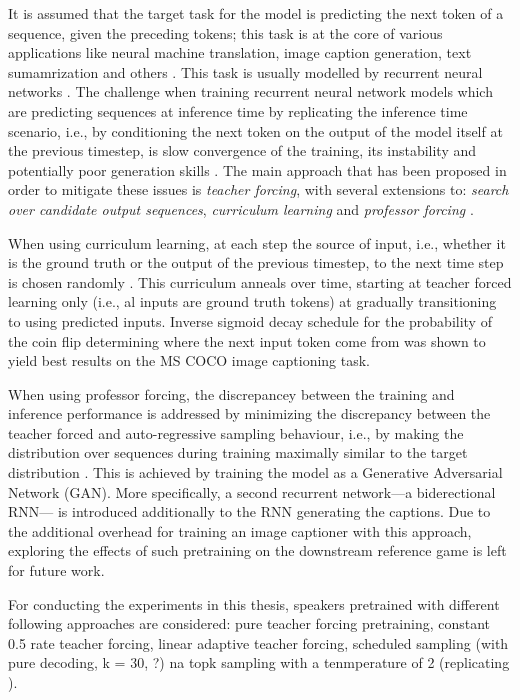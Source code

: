 It is assumed that the target task for the model is predicting the next token of a sequence, given the preceding tokens; this task is at the core of various applications like neural machine translation, image caption generation, text sumamrization and others . This task is usually modelled by recurrent neural networks . The challenge when training recurrent neural network models which are predicting sequences at inference time by replicating the inference time scenario, i.e., by conditioning the next token on the output of the model itself at the previous timestep, is slow convergence of the training, its instability and potentially poor generation skills . The main approach that has been proposed in order to mitigate these issues is \textit{teacher forcing}, with several extensions to: \textit{search over candidate output sequences}, \textit{curriculum learning} and \textit{professor forcing} \parencite{goodfellow2016deep, williams1989algorithm}.

When using curriculum learning, at each step the source of input, i.e., whether it is the ground truth or the output of the previous timestep, to the next time step is chosen randomly \parencite{bengio2015scheduled}. This curriculum anneals over time, starting at teacher forced learning only (i.e., al inputs are ground truth tokens) at gradually transitioning to using predicted inputs. Inverse sigmoid decay schedule for the probability of the coin flip determining where the next input token come from was shown to yield best results on the MS COCO image captioning task.

When using professor forcing, the discrepancey between the training and inference performance is addressed by minimizing the discrepancy between the teacher forced and auto-regressive sampling behaviour, i.e., by making the distribution over sequences during training maximally similar to the target distribution \parencite{lamb2016professor}. This is achieved by training the model as a Generative Adversarial Network (GAN). More specifically, a second recurrent network---a biderectional RNN---  is introduced additionally to the RNN generating the captions. Due to the additional overhead for training an image captioner with this approach, exploring the effects of such pretraining on the downstream reference game is left for future work.

For conducting the experiments in this thesis, speakers pretrained with different following approaches are considered: pure teacher forcing pretraining, constant 0.5 rate teacher forcing, linear adaptive teacher forcing, scheduled sampling (with pure decoding, k = 30, ?) na topk sampling with a tenmperature of 2 (replicating \cite{lazaridou2020multi}). 

